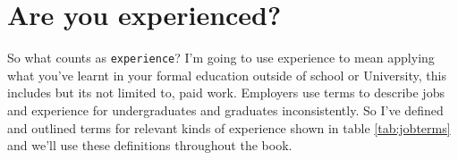 \documentclass[
]{book}
\begin{document}
\hypertarget{areuexperienced}{%
\section{Are you experienced?}\label{areuexperienced}}

So what counts as \texttt{experience}? I'm going to use experience to mean applying what you've learnt in your formal education outside of school or University, this includes but its not limited to, paid work. Employers use terms to describe jobs and experience for undergraduates and graduates inconsistently. So I've defined and outlined terms for relevant kinds of experience shown in table \ref{tab:jobterms} and we'll use these definitions throughout the book.

\begin{table}


\end{table}
\end{document}
